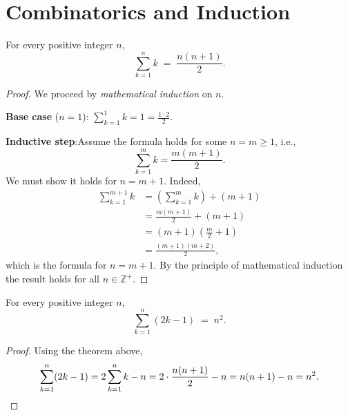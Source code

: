 \section{Combinatorics and Induction}

\begin{Theorem}
For every positive integer $n$,
\[
  \sum_{k=1}^{n} k \;=\; \frac{n(n+1)}{2}.
\]
\end{Theorem}

\begin{proof}
We proceed by \emph{mathematical induction} on $n$.

\pskip
\textbf{Base case} ($n = 1$):\quad
$\displaystyle\sum_{k=1}^{1} k = 1 = \frac{1 \cdot 2}{2}$. \checkmark

\pskip
\textbf{Inductive step}:\quad Assume the formula holds for some $n = m \geq 1$,
i.e.,
\[
  \sum_{k=1}^{m} k = \frac{m(m+1)}{2}.
\]
We must show it holds for $n = m + 1$. Indeed,
\begin{align*}
  \sum_{k=1}^{m+1} k
    &= \left(\sum_{k=1}^{m} k\right) + (m+1) \\[4pt]
    &= \frac{m(m+1)}{2} + (m+1) \\[4pt]
    &= (m+1)\!\left(\frac{m}{2} + 1\right) \\[4pt]
    &= \frac{(m+1)(m+2)}{2},
\end{align*}
which is the formula for $n = m + 1$. By the principle of mathematical
induction the result holds for all $n \in \mathbb{Z}^+$.
\end{proof}

\begin{Corollary}
For every positive integer $n$,
\[
  \sum_{k=1}^{n}(2k-1) \;=\; n^2.
\]
\end{Corollary}

\begin{proof}
Using the theorem above,
\[
  \sum_{k=1}^{n}(2k-1)
    = 2\sum_{k=1}^{n}k - n
    = 2\cdot\frac{n(n+1)}{2} - n
    = n(n+1) - n
    = n^2. \qedhere
\]
\end{proof}

